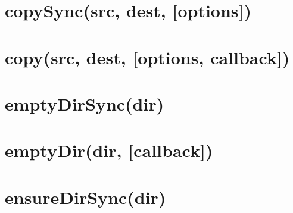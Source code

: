 \documentclass[twoside]{book}
\newcommand{\+}{\discretionary{\mbox{\scriptsize$\hookleftarrow$}}{}{}}
\begin{document}
\chapter{copy\+Sync(src, dest, \mbox{[}options\mbox{]})}
\label{md_dsmacc_examples_DRmerge_node_modules_electron-packager_node_modules_electron-download_node_modules_fs-extra_docs_copy-sync}

\chapter{copy(src, dest, \mbox{[}options, callback\mbox{]})}
\label{md_dsmacc_examples_DRmerge_node_modules_electron-packager_node_modules_electron-download_node_modules_fs-extra_docs_copy}

\chapter{empty\+Dir\+Sync(dir)}
\label{md_dsmacc_examples_DRmerge_node_modules_electron-packager_node_modules_electron-download_node_moa7c38380033eafbea9cbfafe725de082}

\chapter{empty\+Dir(dir, \mbox{[}callback\mbox{]})}
\label{md_dsmacc_examples_DRmerge_node_modules_electron-packager_node_modules_electron-download_node_modules_fs-extra_docs_emptyDir}

\chapter{ensure\+Dir\+Sync(dir)}
\label{md_dsmacc_examples_DRmerge_node_modules_electron-packager_node_modules_electron-download_node_mo964d454b8da4f7e0aaabb639365a6b33}

\end{document}

